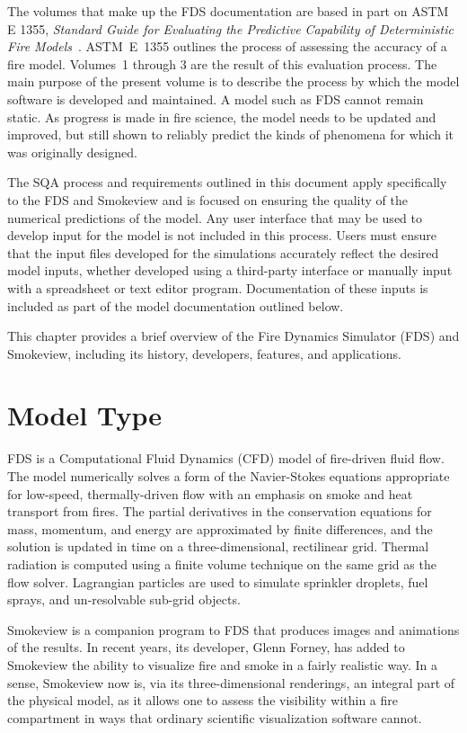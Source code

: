 \documentclass[11pt]{book}
\begin{document}
The volumes that make up the FDS documentation are based in part on ASTM E 1355, {\em Standard Guide for Evaluating the Predictive Capability of Deterministic Fire Models}~\cite{ASTM:E1355}. ASTM~E~1355 outlines the process of assessing the accuracy of a fire model. Volumes~1 through 3 are the result of this evaluation process. The main purpose of the present volume is to describe the process by which the model software is developed and maintained. A model such as FDS cannot remain static. As progress is made in fire science, the model needs to be updated and improved, but still shown to reliably predict the kinds of phenomena for which it was originally designed.

The SQA process and requirements outlined in this document apply specifically to the FDS and Smokeview and is focused on ensuring the quality of the numerical predictions of the model.  Any user interface that may be used to develop input for the model is not included in this process. Users must ensure that the input files developed for the simulations accurately reflect the desired model inputs, whether developed using a third-party interface or manually input with a spreadsheet or text editor program.  Documentation of these inputs is included as part of the model documentation outlined below.

This chapter provides a brief overview of the Fire Dynamics Simulator (FDS) and Smokeview, including its history, developers, features, and applications.


\section{Model Type}

FDS is a Computational Fluid Dynamics (CFD) model of fire-driven fluid flow. The model numerically solves a form of the Navier-Stokes equations
appropriate for low-speed, thermally-driven flow with an emphasis on smoke and heat transport from fires. The partial derivatives in the conservation
equations for mass, momentum, and energy are approximated by finite differences, and the solution is updated in time on a three-dimensional,
rectilinear grid. Thermal radiation is computed using a finite volume technique on the same grid as the flow solver. Lagrangian particles are used to
simulate sprinkler droplets, fuel sprays, and un-resolvable sub-grid objects.

Smokeview is a companion program to FDS that produces images and animations of the results. In recent years, its developer, Glenn Forney, has added
to Smokeview the ability to visualize fire and smoke in a fairly realistic way. In a sense, Smokeview now is, via its three-dimensional renderings,
an integral part of the physical model, as it allows one to assess the visibility within a fire compartment in ways that ordinary scientific
visualization software cannot.
\end{document}
